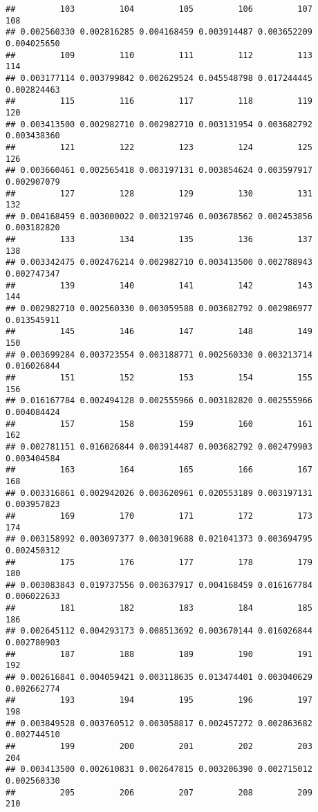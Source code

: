 \documentclass[
]{article}
\begin{document}
\begin{verbatim}
##         103         104         105         106         107         108 
## 0.002560330 0.002816285 0.004168459 0.003914487 0.003652209 0.004025650 
##         109         110         111         112         113         114 
## 0.003177114 0.003799842 0.002629524 0.045548798 0.017244445 0.002824463 
##         115         116         117         118         119         120 
## 0.003413500 0.002982710 0.002982710 0.003131954 0.003682792 0.003438360 
##         121         122         123         124         125         126 
## 0.003660461 0.002565418 0.003197131 0.003854624 0.003597917 0.002907079 
##         127         128         129         130         131         132 
## 0.004168459 0.003000022 0.003219746 0.003678562 0.002453856 0.003182820 
##         133         134         135         136         137         138 
## 0.003342475 0.002476214 0.002982710 0.003413500 0.002788943 0.002747347 
##         139         140         141         142         143         144 
## 0.002982710 0.002560330 0.003059588 0.003682792 0.002986977 0.013545911 
##         145         146         147         148         149         150 
## 0.003699284 0.003723554 0.003188771 0.002560330 0.003213714 0.016026844 
##         151         152         153         154         155         156 
## 0.016167784 0.002494128 0.002555966 0.003182820 0.002555966 0.004084424 
##         157         158         159         160         161         162 
## 0.002781151 0.016026844 0.003914487 0.003682792 0.002479903 0.003404584 
##         163         164         165         166         167         168 
## 0.003316861 0.002942026 0.003620961 0.020553189 0.003197131 0.003957823 
##         169         170         171         172         173         174 
## 0.003158992 0.003097377 0.003019688 0.021041373 0.003694795 0.002450312 
##         175         176         177         178         179         180 
## 0.003083843 0.019737556 0.003637917 0.004168459 0.016167784 0.006022633 
##         181         182         183         184         185         186 
## 0.002645112 0.004293173 0.008513692 0.003670144 0.016026844 0.002780903 
##         187         188         189         190         191         192 
## 0.002616841 0.004059421 0.003118635 0.013474401 0.003040629 0.002662774 
##         193         194         195         196         197         198 
## 0.003849528 0.003760512 0.003058817 0.002457272 0.002863682 0.002744510 
##         199         200         201         202         203         204 
## 0.003413500 0.002610831 0.002647815 0.003206390 0.002715012 0.002560330 
##         205         206         207         208         209         210 

\end{verbatim}
\end{document}
